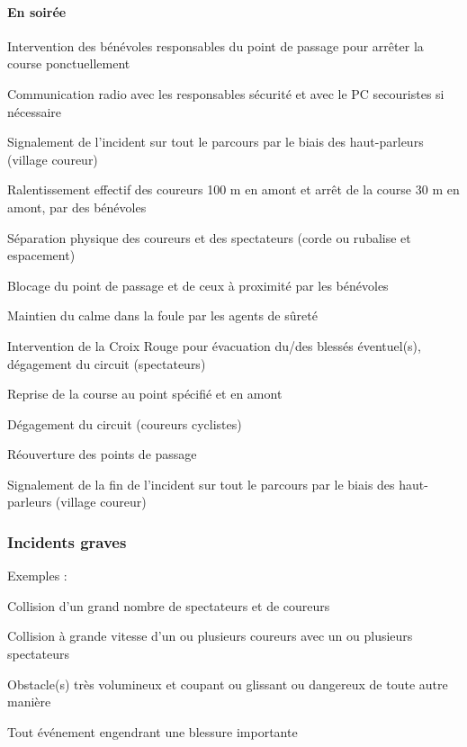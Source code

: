 \documentclass[hidelinks, paper=a4, fontsize=13pt]{report}
\begin{document}
\paragraph{En soirée}
\begin{list}{•}{}
\item Intervention des bénévoles responsables du point de passage pour arrêter la course ponctuellement 
\item Communication radio avec les responsables sécurité et avec le PC secouristes si nécessaire
\item Signalement de l’incident sur tout le parcours par le biais des haut-parleurs (village coureur)
\item Ralentissement effectif des coureurs 100 m en amont et arrêt de la course 30 m en amont, par des bénévoles
\item Séparation physique des coureurs et des spectateurs (corde ou rubalise et espacement)
\item Blocage du point de passage et de ceux à proximité par les bénévoles
\item Maintien du calme dans la foule par les agents de sûreté
\item Intervention de la Croix Rouge pour évacuation du/des blessés éventuel(s), dégagement du circuit (spectateurs)
\item Reprise de la course au point spécifié et en amont
\item Dégagement du circuit (coureurs cyclistes)
\item Réouverture des points de passage
\item Signalement de la fin de l’incident sur tout le parcours par le biais des haut-parleurs (village coureur)
\end{list}


\subsubsection{Incidents graves}

Exemples :
\begin{list}{•}{}
\item Collision d’un grand nombre de spectateurs et de coureurs
\item Collision à grande vitesse d’un ou plusieurs coureurs avec un ou plusieurs spectateurs
\item Obstacle(s) très volumineux et coupant ou glissant ou dangereux de toute autre manière
\item Tout événement engendrant une blessure importante
\end{list}
\end{document}
